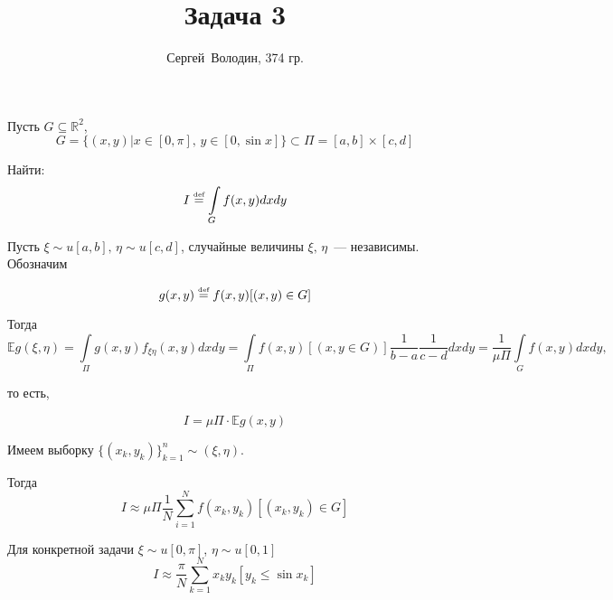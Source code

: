 \documentclass[a4paper]{article}
\author{Сергей~Володин, 374 гр.}
\title{Задача 3}
\def\eqdef{\overset{\mbox{\tiny def}}{=}}
\begin{document}
\maketitle
Пусть $G\subseteq \mathbb{R}^2$, $$G=\{(x,y)|x\in[0,\pi],\,y\in[0,\sin x]\}\subset \Pi=[a,b]\times[c,d]$$

Найти: $$I\eqdef \int\limits_G f(x,y)dxdy$$

Пусть $\xi\sim u[a,b],\,\eta\sim u[c,d]$, случайные величины $\xi,\,\eta$~--- независимы. Обозначим

$$g(x,y)\eqdef f(x,y)[(x,y)\in G]$$

Тогда $$\mathbb{E} g(\xi,\eta)=\int\limits_\Pi g(x,y)f_{\xi\eta}(x,y)dxdy=\int\limits_\Pi f(x,y)[(x,y\in G)]\frac{1}{b-a}\frac{1}{c-d}dxdy=\frac{1}{\mu \Pi}\int\limits_G f(x,y) dxdy,$$

то есть,

$$I=\mu \Pi\cdot \mathbb{E}g(x,y)$$

Имеем выборку $\{(x_k,y_k)\}_{k=1}^n\sim (\xi,\eta)$.

Тогда $$I\approx \mu\Pi\frac{1}{N}\sum\limits_{i=1}^Nf(x_k,y_k)[(x_k,y_k)\in G]$$

Для конкретной задачи $\xi\sim u[0,\pi]$, $\eta\sim u[0,1]$ $$I\approx\frac{\pi}{N}\sum\limits_{k=1}^Nx_ky_k[y_k\leqslant\sin x_k]$$
\end{document}
